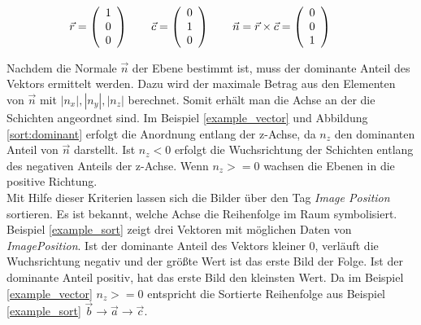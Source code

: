 \begin{equation}
\vec{r}=\left(\begin{array}{c} 1 \\ 0 \\ 0 \end{array}\right) \qquad
\vec{c}=\left(\begin{array}{c} 0 \\ 1 \\ 0 \end{array}\right) \qquad
\vec{n}=\vec{r}\times\vec{c}=\left(\begin{array}{c} 0 \\ 0 \\ 1 \end{array}\right) \qquad
\vspace{0.5cm}
\label{example_vector}
\end{equation}

Nachdem die Normale $\vec{n}$ der Ebene bestimmt ist, muss der dominante Anteil des Vektors ermittelt werden. Dazu wird der maximale Betrag aus den Elementen von $ \vec{n}$ mit $|n_x|, |n_y|, |n_z|$ berechnet. Somit erhält man die Achse an der die Schichten angeordnet sind. Im Beispiel \ref{example_vector} und Abbildung \ref{sort:dominant} erfolgt die Anordnung entlang der z-Achse, da $n_z$ den dominanten Anteil von $\vec{n}$ darstellt. Ist $n_z < 0$ erfolgt die Wuchsrichtung der Schichten entlang des negativen Anteils der z-Achse. Wenn $n_z >= 0$ wachsen die Ebenen in die positive Richtung.\\
Mit Hilfe dieser Kriterien lassen sich die Bilder über den Tag \textit{Image Position} sortieren. Es ist bekannt, welche Achse die Reihenfolge im Raum symbolisiert. Beispiel \ref{example_sort} zeigt drei Vektoren mit möglichen Daten von \textit{ImagePosition}. Ist der dominante Anteil des Vektors kleiner 0, verläuft die Wuchsrichtung negativ und der größte Wert ist das erste Bild der Folge. Ist der dominante Anteil positiv, hat das erste Bild den kleinsten Wert. Da im Beispiel \ref{example_vector} $n_z >= 0$ entspricht die Sortierte Reihenfolge aus Beispiel \ref{example_sort} $\vec{b}\rightarrow\vec{a}\rightarrow\vec{c}$.

